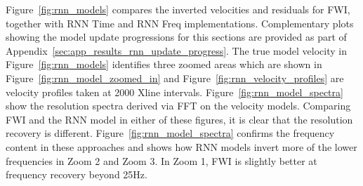 Figure~\ref{fig:rnn_models} compares the inverted velocities and residuals for FWI, together with RNN Time and RNN Freq implementations. Complementary plots showing the model update progressions for this sections are provided as part of Appendix~\ref{sec:app_results_rnn_update_progress}. The true model velocity in Figure~\ref{fig:rnn_models} identifies three zoomed areas which are shown in Figure~\ref{fig:rnn_model_zoomed_in} and Figure~\ref{fig:rnn_velocity_profiles} are velocity profiles taken at 2000 Xline intervals. Figure~\ref{fig:rnn_model_spectra} show the resolution spectra derived via FFT on the velocity models. Comparing FWI and the RNN model in either of these figures, it is clear that the resolution recovery is different. Figure~\ref{fig:rnn_model_spectra} confirms the frequency content in these approaches and shows how RNN models invert more of the lower frequencies in Zoom 2 and Zoom 3. In Zoom 1, FWI is slightly better at frequency recovery beyond 25Hz.

